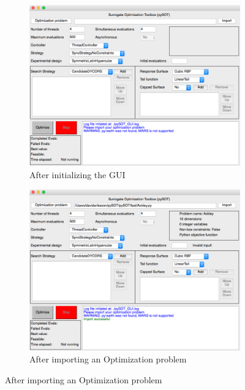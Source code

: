 \documentclass[]{article}
\begin{document}
\begin{figure}
        \centering
        \begin{subfigure}{0.49\textwidth}\centering%
                    \includegraphics[width=\linewidth]{./Pics/GUI1}
                \caption{After initializing the GUI}
  \label{fig:First_figure}
       \end{subfigure}
    \hfill
        \begin{subfigure}{0.49\textwidth}\centering
                    \includegraphics[width=\linewidth]{./Pics/GUI2}
                \caption{After importing an Optimization problem}
  \label{fig:Second_figure}
       \end{subfigure}%

\end{figure}
\end{document}
